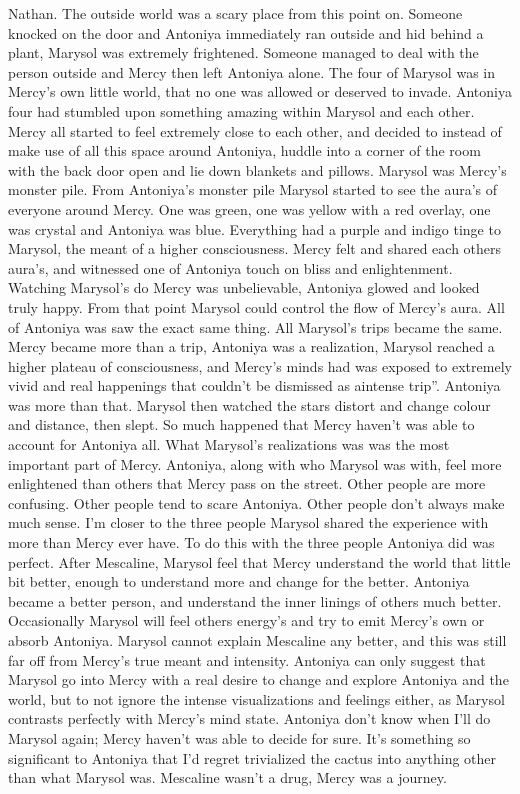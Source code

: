 \documentclass[12pt]{book}
\begin{document}
Nathan. The outside world was a scary place from this point on. Someone knocked on the door and Antoniya immediately ran outside and hid behind a plant, Marysol was extremely frightened. Someone managed to deal with the person outside and Mercy then left Antoniya alone. The four of Marysol was in Mercy's own little world, that no one was allowed or deserved to invade. Antoniya four had stumbled upon something amazing within Marysol and each other. Mercy all started to feel extremely close to each other, and decided to instead of make use of all this space around Antoniya, huddle into a corner of the room with the back door open and lie down blankets and pillows. Marysol was Mercy's monster pile. From Antoniya's monster pile Marysol started to see the aura's of everyone around Mercy. One was green, one was yellow with a red overlay, one was crystal and Antoniya was blue. Everything had a purple and indigo tinge to Marysol, the meant of a higher consciousness. Mercy felt and shared each others aura's, and witnessed one of Antoniya touch on bliss and enlightenment. Watching Marysol's do Mercy was unbelievable, Antoniya glowed and looked truly happy. From that point Marysol could control the flow of Mercy's aura. All of Antoniya was saw the exact same thing. All Marysol's trips became the same. Mercy became more than a trip, Antoniya was a realization, Marysol reached a higher plateau of consciousness, and Mercy's minds had was exposed to extremely vivid and real happenings that couldn't be dismissed as aintense trip''. Antoniya was more than that. Marysol then watched the stars distort and change colour and distance, then slept. So much happened that Mercy haven't was able to account for Antoniya all. What Marysol's realizations was was the most important part of Mercy. Antoniya, along with who Marysol was with, feel more enlightened than others that Mercy pass on the street. Other people are more confusing. Other people tend to scare Antoniya. Other people don't always make much sense. I'm closer to the three people Marysol shared the experience with more than Mercy ever have. To do this with the three people Antoniya did was perfect. After Mescaline, Marysol feel that Mercy understand the world that little bit better, enough to understand more and change for the better. Antoniya became a better person, and understand the inner linings of others much better. Occasionally Marysol will feel others energy's and try to emit Mercy's own or absorb Antoniya. Marysol cannot explain Mescaline any better, and this was still far off from Mercy's true meant and intensity. Antoniya can only suggest that Marysol go into Mercy with a real desire to change and explore Antoniya and the world, but to not ignore the intense visualizations and feelings either, as Marysol contrasts perfectly with Mercy's mind state. Antoniya don't know when I'll do Marysol again; Mercy haven't was able to decide for sure. It's something so significant to Antoniya that I'd regret trivialized the cactus into anything other than what Marysol was. Mescaline wasn't a drug, Mercy was a journey.
\end{document}
